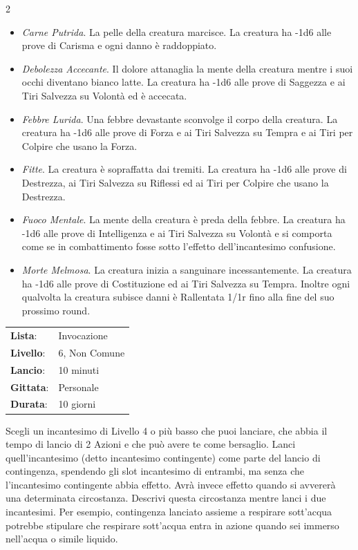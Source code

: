 \begin{multicols}{2}
\begin{itemize}[leftmargin=*] \setlength{\itemsep}{0pt}
	\item \emph{Carne Putrida}. La pelle della creatura marcisce. La creatura ha -1d6 alle prove di Carisma e ogni danno è raddoppiato.
	\item \emph{Debolezza Accecante}. Il dolore attanaglia la mente della creatura mentre i suoi occhi diventano bianco latte. La creatura ha -1d6 alle prove di Saggezza e ai Tiri Salvezza su Volontà ed è accecata.
	\item \emph{Febbre Lurida}. Una febbre devastante sconvolge il corpo della creatura. La creatura ha -1d6 alle prove di Forza e ai Tiri Salvezza su Tempra e ai Tiri per Colpire che usano la Forza.
	\item \emph{Fitte}. La creatura è sopraffatta dai tremiti. La creatura ha -1d6 alle prove di Destrezza, ai Tiri Salvezza su Riflessi ed ai Tiri per Colpire che usano la Destrezza.
	\item \emph{Fuoco Mentale}. La mente della creatura è preda della febbre. La creatura ha -1d6 alle prove di Intelligenza e ai Tiri Salvezza su Volontà e si comporta come se in combattimento fosse sotto l'effetto dell'incantesimo confusione.
	\item \emph{Morte Melmosa}. La creatura inizia a sanguinare incessantemente. La creatura ha -1d6 alle prove di Costituzione ed ai Tiri Salvezza su Tempra. Inoltre ogni qualvolta la creatura subisce danni è Rallentata 1/1r fino alla fine del suo prossimo round.
\end{itemize}

\noindent\begin{tabularx}{\linewidth}{p{1.9cm}X}
	\rowcolor{gray!20}\textbf{Lista}: & Invocazione \\
	\textbf{Livello}: & 6, Non Comune \\
	\rowcolor{gray!20}\textbf{Lancio}: & 10 minuti \\
	\textbf{Gittata}: & Personale \\
	\rowcolor{gray!20}\textbf{Durata}: & 10 giorni \\
\end{tabularx}\smallskip

Scegli un incantesimo di Livello 4 o più basso che puoi lanciare, che abbia il tempo di lancio di 2 Azioni e che può avere te come bersaglio. Lanci quell'incantesimo (detto incantesimo contingente) come parte del lancio di contingenza, spendendo gli slot incantesimo di entrambi, ma senza che l'incantesimo contingente abbia effetto. Avrà invece effetto quando si avvererà una determinata circostanza. Descrivi questa circostanza mentre lanci i due incantesimi. Per esempio, contingenza lanciato assieme a respirare sott'acqua potrebbe stipulare che respirare sott'acqua entra in azione quando sei immerso nell'acqua o simile liquido.


\end{multicols}
